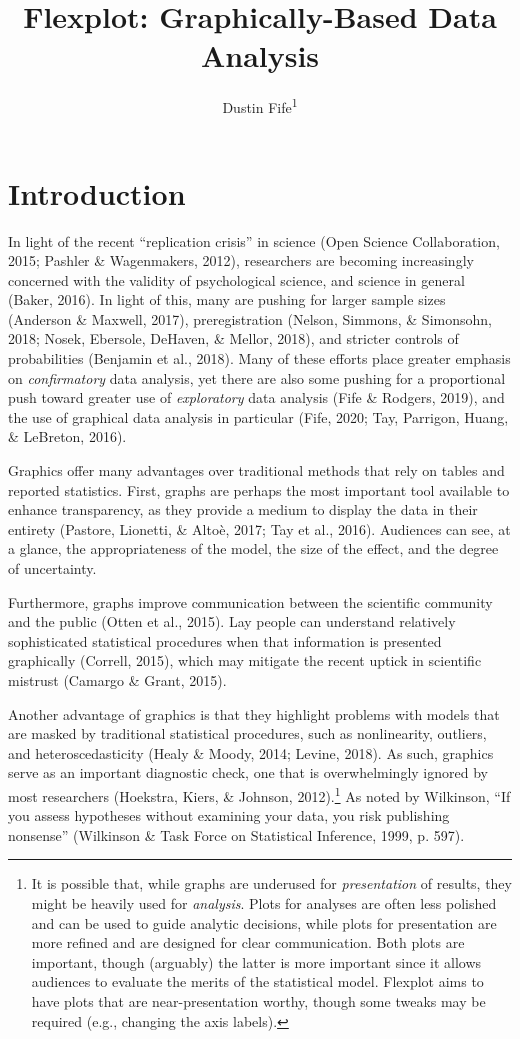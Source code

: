\documentclass[
  english,
  man]{apa6}
\title{Flexplot: Graphically-Based Data Analysis}
\author{Dustin Fife\textsuperscript{1}}
\date{}
\affiliation{\vspace{0.5cm}\textsuperscript{1} Rowan University}
\begin{document}
\maketitle

\hypertarget{introduction}{%
\section{Introduction}\label{introduction}}

In light of the recent ``replication crisis'' in science (Open Science Collaboration, 2015; Pashler \& Wagenmakers, 2012), researchers are becoming increasingly concerned with the validity of psychological science, and science in general (Baker, 2016). In light of this, many are pushing for larger sample sizes (Anderson \& Maxwell, 2017), preregistration (Nelson, Simmons, \& Simonsohn, 2018; Nosek, Ebersole, DeHaven, \& Mellor, 2018), and stricter controls of probabilities (Benjamin et al., 2018). Many of these efforts place greater emphasis on \emph{confirmatory} data analysis, yet there are also some pushing for a proportional push toward greater use of \emph{exploratory} data analysis (Fife \& Rodgers, 2019), and the use of graphical data analysis in particular (Fife, 2020; Tay, Parrigon, Huang, \& LeBreton, 2016).

Graphics offer many advantages over traditional methods that rely on tables and reported statistics. First, graphs are perhaps the most important tool available to enhance transparency, as they provide a medium to display the data in their entirety (Pastore, Lionetti, \& Altoè, 2017; Tay et al., 2016). Audiences can see, at a glance, the appropriateness of the model, the size of the effect, and the degree of uncertainty.

Furthermore, graphs improve communication between the scientific community and the public (Otten et al., 2015). Lay people can understand relatively sophisticated statistical procedures when that information is presented graphically (Correll, 2015), which may mitigate the recent uptick in scientific mistrust (Camargo \& Grant, 2015).

Another advantage of graphics is that they highlight problems with models that are masked by traditional statistical procedures, such as nonlinearity, outliers, and heteroscedasticity (Healy \& Moody, 2014; Levine, 2018). As such, graphics serve as an important diagnostic check, one that is overwhelmingly ignored by most researchers (Hoekstra, Kiers, \& Johnson, 2012).\footnote{It is possible that, while graphs are underused for \emph{presentation} of results, they might be heavily used for \emph{analysis}. Plots for analyses are often less polished and can be used to guide analytic decisions, while plots for presentation are more refined and are designed for clear communication. Both plots are important, though (arguably) the latter is more important since it allows audiences to evaluate the merits of the statistical model. Flexplot aims to have plots that are near-presentation worthy, though some tweaks may be required (e.g., changing the axis labels).} As noted by Wilkinson, ``If you assess hypotheses without examining your data, you risk publishing nonsense'' (Wilkinson \& Task Force on Statistical Inference, 1999, p. 597).
\end{document}
